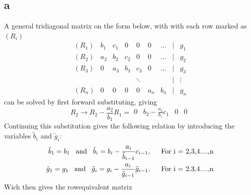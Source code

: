 \documentclass[english,notitlepage]{revtex4-1}  %
\begin{document}
    \subsection*{a}
        \label{sec:6a}
        A general tridiagonal matrix on the form below, with with each row marked as $(R_i)$
        \begin{equation}
            \begin{matrix}
                (R_1) & b_1 & c_1 & 0 &0 & 0 & \dots & | & g_1
                \\
                (R_2) & a_2 & b_2 & c_2 & 0 & 0 & \dots & | & g_2
                \\
                (R_3) & 0 & a_3 & b_3 & c_3 & 0 & \dots & | & g_3
                \\
                & & & &  \ddots& &  &| & \vdots
                \\
                (R_n) & 0 & 0 & 0 & 0 & a_n & b_n &|& g_n
            \end{matrix}
        \end{equation}
        can be solved by first forward substituting, giving 
        \begin{equation*}
                R_2 \rightarrow R_2 - \frac{a_2}{b_1}R_1 
            =   \begin{matrix}
                    0 & b_2 - \frac{a_2}{b_1}c_1 & 0 & 0
                \end{matrix}
        \end{equation*}
        Continuing this substitution gives the following relation by introducing the variables $\tilde{b}_i$ and $\tilde{g}_i$:
        \begin{align*}
                \tilde{b}_1 
            =   b_1
            \hspace{3mm}\text{and}\hspace{3mm}
                \tilde{b}_i 
            =   b_i - \frac{a_i}{\tilde{b}_{i-1}}c_{i-1}, 
            \hspace{5mm}\text{For i = 2,3,4....,n}\\
                \tilde{g}_1 
            =   g_1
            \hspace{3mm}\text{and}\hspace{3mm}
                \tilde{g}_i 
            =   g_i - \frac{a_i}{\tilde{g}_{i-1}}\tilde{g}_{i-1}, 
            \hspace{5mm}\text{For i = 2,3,4....,n}
        \end{align*}
        Wich then gives the rowequivalent matrix
\end{document}
